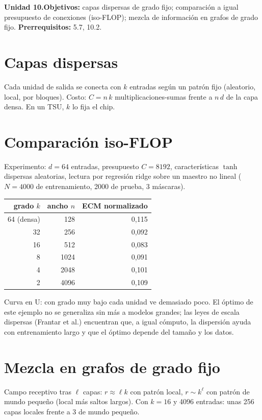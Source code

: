 \documentclass[11pt,a4paper]{article}
\begin{document}

\noindent\textbf{Unidad 10.}\quad\textbf{Objetivos:} capas dispersas de grado fijo; comparación a igual presupuesto de conexiones (iso-FLOP); mezcla de información en
grafos de grado fijo.
\textbf{Prerrequisitos:} 5.7, 10.2.

\section{Capas dispersas}
Cada unidad de salida se conecta con $k$ entradas según un patrón fijo (aleatorio, local, por bloques). Costo: $C=n\,k$ multiplicaciones-sumas frente a $n\,d$ de la capa
densa. En un TSU, $k$ lo fija el chip.

\section{Comparación iso-FLOP \evS}
Experimento: $d=64$ entradas, presupuesto $C=8192$, características $\tanh$ dispersas aleatorias, lectura por regresión ridge sobre un maestro no lineal ($N=4000$ de
entrenamiento, 2000 de prueba, 3 máscaras).
\begin{center}\small\begin{tabular}{rrr}\toprule
grado $k$ & ancho $n$ & ECM normalizado\\\midrule
64 (densa) & 128 & 0{,}115\\ 32 & 256 & 0{,}092\\ 16 & 512 & 0{,}083\\ 8 & 1024 & 0{,}091\\ 4 & 2048 & 0{,}101\\ 2 & 4096 & 0{,}109\\\bottomrule
\end{tabular}\end{center}
Curva en U: con grado muy bajo cada unidad ve demasiado poco. El óptimo de este ejemplo no se generaliza sin más a modelos grandes; las leyes de escala dispersas
(Frantar et al.) encuentran que, a igual cómputo, la dispersión ayuda con entrenamiento largo y que el óptimo depende del tamaño y los datos.

\section{Mezcla en grafos de grado fijo}
Campo receptivo tras $\ell$ capas: $r\approx\ell k$ con patrón local, $r\sim k^\ell$ con patrón de mundo pequeño (local más saltos largos). Con $k=16$ y 4096 entradas:
unas 256 capas locales frente a 3 de mundo pequeño.
\end{document}
